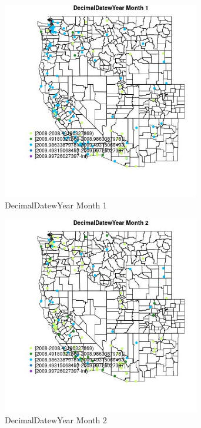 \begin{figure} 
\centering  
\includegraphics[width=0.77\textwidth]{Code_Outputs/Report_ML_input_PM25_Step4_part_e_de_duplicated_aves_MapObsMo1DecimalDatewYear.jpg} 
\caption{\label{fig:Report_ML_input_PM25_Step4_part_e_de_duplicated_avesMapObsMo1DecimalDatewYear}DecimalDatewYear Month 1} 
\end{figure} 
 

\clearpage 

\begin{figure} 
\centering  
\includegraphics[width=0.77\textwidth]{Code_Outputs/Report_ML_input_PM25_Step4_part_e_de_duplicated_aves_MapObsMo2DecimalDatewYear.jpg} 
\caption{\label{fig:Report_ML_input_PM25_Step4_part_e_de_duplicated_avesMapObsMo2DecimalDatewYear}DecimalDatewYear Month 2} 
\end{figure} 
 


